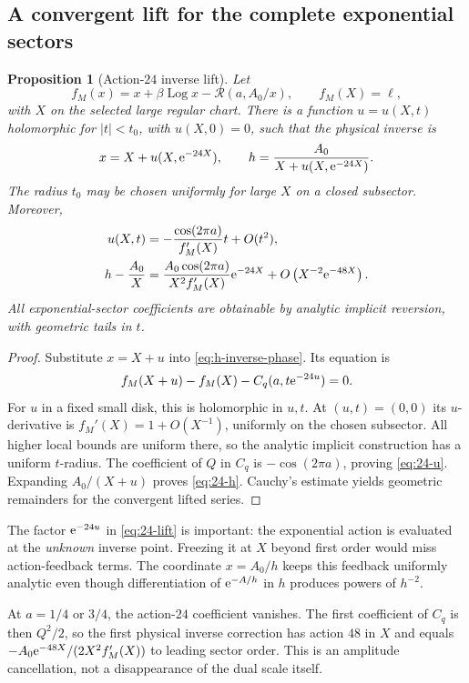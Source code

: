 \documentclass[11pt,a4paper]{article}
\numberwithin{equation}{section}
\newtheorem{proposition}[theorem]{Proposition}
\theoremstyle{definition}
\theoremstyle{remark}\newtheorem{remark}[theorem]{Remark}
\newcommand{\Log}{\operatorname{Log}}\newcommand{\Li}{\operatorname{Li}}
\begin{document}
\subsection{A convergent lift for the complete exponential sectors}
\begin{proposition}[Action-$24$ inverse lift]\label{prop:24}
Let
\[
 f_M(x)=x+\beta\Log x-\mathcal R(a,A_0/x),
 \qquad f_M(X)=\ell,
\]
with $X$ on the selected large regular chart. There is a function
$u=u(X,t)$ holomorphic for $|t|<t_0$, with $u(X,0)=0$, such that the
physical inverse is
\begin{equation}\label{eq:24-exact}
 x=X+u(X,\mathrm e^{-24X}),\qquad
 h=\frac{A_0}{X+u(X,\mathrm e^{-24X})}.
\end{equation}
The radius $t_0$ may be chosen uniformly for large $X$ on a closed
subsector. Moreover,
\begin{align}
 u(X,t)&=-\frac{\cos(2\pi a)}{f_M'(X)}t+O(t^2),\label{eq:24-u}\\
 h-\frac{A_0}{X}&=
  \frac{A_0\cos(2\pi a)}{X^2f_M'(X)}\mathrm e^{-24X}
          +O\left(X^{-2}\mathrm e^{-48X}\right).
          \label{eq:24-h}
\end{align}
All exponential-sector coefficients are obtainable by analytic implicit
reversion, with geometric tails in $t$.
\end{proposition}
\begin{proof}
Substitute $x=X+u$ into \eqref{eq:h-inverse-phase}. Its equation is
\begin{equation}\label{eq:24-lift}
 f_M(X+u)-f_M(X)-C_q(a,t\mathrm e^{-24u})=0.
\end{equation}
For $u$ in a fixed small disk, this is holomorphic in $u,t$.
At $(u,t)=(0,0)$ its $u$-derivative is
$f_M'(X)=1+O(X^{-1})$, uniformly on the chosen subsector.
All higher local bounds are uniform there, so the analytic implicit
construction has a uniform $t$-radius. The coefficient of $Q$ in
$C_q$ is $-\cos(2\pi a)$, proving \eqref{eq:24-u}.
Expanding $A_0/(X+u)$ proves \eqref{eq:24-h}. Cauchy's estimate yields
geometric remainders for the convergent lifted series.
\end{proof}
The factor $\mathrm e^{-24u}$ in \eqref{eq:24-lift} is important: the
exponential action is evaluated at the \emph{unknown} inverse point.
Freezing it at $X$ beyond first order would miss action-feedback terms.
The coordinate $x=A_0/h$ keeps this feedback uniformly analytic even
though differentiation of $\mathrm e^{-A/h}$ in $h$ produces powers of $h^{-2}$.

At $a=1/4$ or $3/4$, the action-$24$ coefficient vanishes. The first
coefficient of $C_q$ is then $Q^2/2$, so the first physical inverse
correction has action $48$ in $X$ and equals
$-A_0\mathrm e^{-48X}/(2X^2 f_M'(X))$ to leading sector order. This is an
amplitude cancellation, not a disappearance of the dual scale itself.
\end{document}
